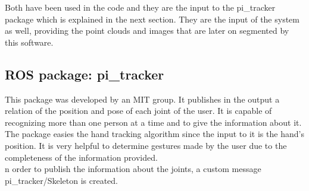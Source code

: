 Both have been used in the code and they are the input to the pi\_tracker package which is explained in the next section. They are the input of the system as well, providing the point clouds and images that are later on segmented by this software. 


\subsection{ROS package: pi\_tracker}

This package was developed by an MIT group. It publishes in the output a relation of the position and pose of each joint of the user. It is capable of recognizing more than one person at a time and to give the information about it. 
\\

The package easies the hand tracking algorithm since the input to it is the hand's position. It is very helpful to determine gestures made by the user due to the completeness of the information provided. 
\\

n order to publish the information about the joints, a custom message pi\_tracker/Skeleton is created. 